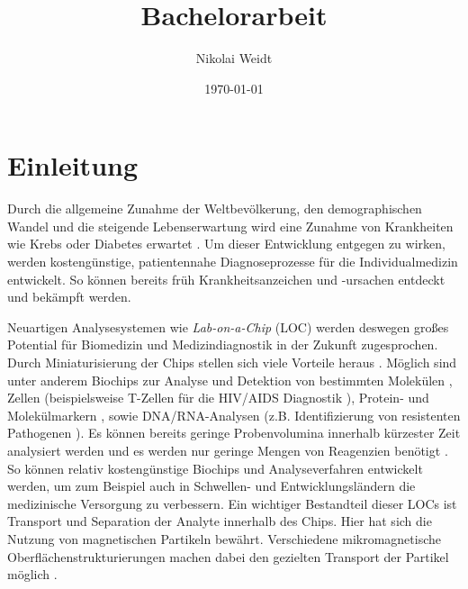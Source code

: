 \documentclass[page,pdftex,12pt,a4paper,twoside,openright]{scrbook}
\author{Nikolai Weidt}
\date{\today}
\title{Bachelorarbeit}
\begin{document}
\setcounter{tocdepth}{2}
\tableofcontents


\chapter{Einleitung \label{sec-einleitung}}
\label{sec:orgedc2187}
Durch die allgemeine Zunahme der Weltbevölkerung, den demographischen Wandel und die steigende Lebenserwartung wird eine Zunahme von Krankheiten wie Krebs oder Diabetes erwartet \cite{bray_global_2018,zhou_worldwide_2016}. Um dieser Entwicklung entgegen zu wirken, werden kostengünstige, patientennahe Diagnoseprozesse für die Individualmedizin entwickelt. So können bereits früh Krankheitsanzeichen und -ursachen entdeckt und bekämpft werden.

Neuartigen Analysesystemen wie \emph{Lab-on-a-Chip} (LOC) werden deswegen großes Potential für Biomedizin und Medizindiagnostik in der Zukunft zugesprochen. Durch Miniaturisierung der Chips stellen sich viele Vorteile heraus \cite{stone_microfluidics_2001,knight_honey_2002}.
Möglich sind unter anderem Biochips zur Analyse und Detektion von bestimmten Molekülen \cite{papadea_evaluation_2002}, Zellen (beispielsweise T-Zellen für die HIV/AIDS Diagnostik \cite{cheng_microchip_2007}), Protein- und Molekülmarkern \cite{wang_self-powered_2010}, sowie DNA/RNA-Analysen (z.B. Identifizierung von resistenten Pathogenen \cite{boehme_rapid_2010}). Es können bereits geringe Probenvolumina innerhalb kürzester Zeit analysiert werden und es werden nur geringe Mengen von Reagenzien benötigt \cite{chin_commercialization_2012}. So können relativ kostengünstige Biochips und Analyseverfahren entwickelt werden, um zum Beispiel auch in Schwellen- und Entwicklungsländern die medizinische Versorgung zu verbessern. Ein wichtiger Bestandteil dieser LOCs ist Transport und Separation der Analyte innerhalb des Chips. Hier hat sich die Nutzung von magnetischen Partikeln bewährt. Verschiedene mikromagnetische Oberflächenstrukturierungen machen dabei den gezielten Transport der Partikel möglich \cite{rampini_micromagnet_2016}.  
\end{document}
